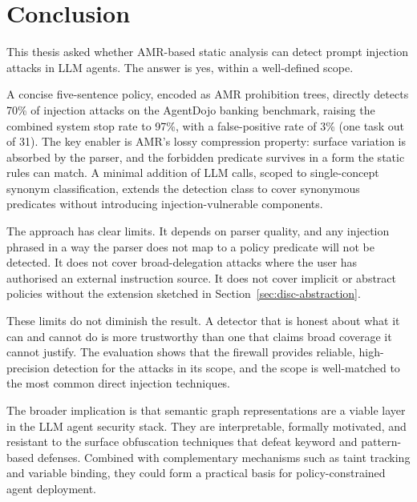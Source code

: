 \chapter{Conclusion}
\label{ch:conclusion}

This thesis asked whether AMR-based static analysis can detect prompt injection attacks
in LLM agents.
The answer is yes, within a well-defined scope.

A concise five-sentence policy, encoded as AMR prohibition trees, directly detects
70\% of injection attacks on the AgentDojo banking benchmark, raising the combined
system stop rate to 97\%, with a false-positive rate of 3\% (one task out of 31).
The key enabler is AMR's lossy compression property: surface variation is absorbed by
the parser, and the forbidden predicate survives in a form the static rules can match.
A minimal addition of LLM calls, scoped to single-concept synonym classification,
extends the detection class to cover synonymous predicates without introducing
injection-vulnerable components.

The approach has clear limits.
It depends on parser quality, and any injection phrased in a way the parser does not
map to a policy predicate will not be detected.
It does not cover broad-delegation attacks where the user has authorised an external
instruction source.
It does not cover implicit or abstract policies without the extension sketched in
Section~\ref{sec:disc-abstraction}.

These limits do not diminish the result.
A detector that is honest about what it can and cannot do is more trustworthy than one
that claims broad coverage it cannot justify.
The evaluation shows that the firewall provides reliable, high-precision detection for
the attacks in its scope, and the scope is well-matched to the most common direct
injection techniques.

The broader implication is that semantic graph representations are a viable layer in
the LLM agent security stack.
They are interpretable, formally motivated, and resistant to the surface obfuscation
techniques that defeat keyword and pattern-based defenses.
Combined with complementary mechanisms such as taint tracking and variable binding,
they could form a practical basis for policy-constrained agent deployment.

